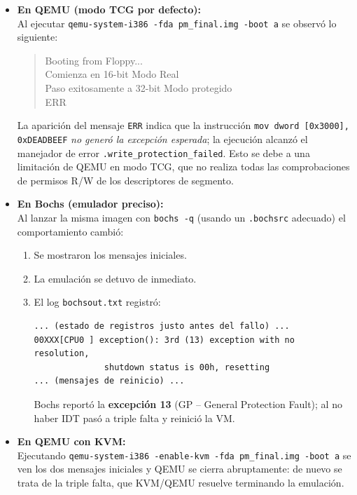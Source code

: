 \begin{itemize}
    \item \textbf{En QEMU (modo TCG por defecto):} \\
    Al ejecutar \verb|qemu-system-i386 -fda pm_final.img -boot a| se observó lo siguiente:
    
    \begin{quote}
        \ttfamily
        Booting from Floppy... \\
        Comienza en 16-bit Modo Real \\
        Paso exitosamente a 32-bit Modo protegido \\
        ERR
        \end{quote}
    
        La aparición del mensaje \texttt{ERR} indica que la instrucción
        \texttt{mov dword [0x3000], 0xDEADBEEF}
        \emph{no generó la excepción esperada}; la ejecución alcanzó el
        manejador de error \texttt{.write\_protection\_failed}.
        Esto se debe a una limitación de QEMU en modo TCG, que no realiza todas
        las comprobaciones de permisos R/W de los descriptores de segmento.
        
    \item \textbf{En Bochs (emulador preciso):} \\
    Al lanzar la misma imagen con \verb|bochs -q| (usando un \texttt{.bochsrc}
    adecuado) el comportamiento cambió:

    \begin{enumerate}[label=(\alph*)]
        \item Se mostraron los mensajes iniciales.
        \item La emulación se detuvo de inmediato.
        \item El log \texttt{bochsout.txt} registró:
        
        \begin{verbatim}
... (estado de registros justo antes del fallo) ...
00XXX[CPU0 ] exception(): 3rd (13) exception with no resolution,
              shutdown status is 00h, resetting
... (mensajes de reinicio) ...
        \end{verbatim}
        
        Bochs reportó la \textbf{excepción 13} (GP – General Protection Fault);
        al no haber IDT pasó a triple falta y reinició la VM.
    \end{enumerate}

    \item \textbf{En QEMU con KVM:} \\
    Ejecutando \verb|qemu-system-i386 -enable-kvm -fda pm_final.img -boot a|
    se ven los dos mensajes iniciales y QEMU se cierra abruptamente: de nuevo
    se trata de la triple falta, que KVM/QEMU resuelve terminando la emulación.
\end{itemize}

